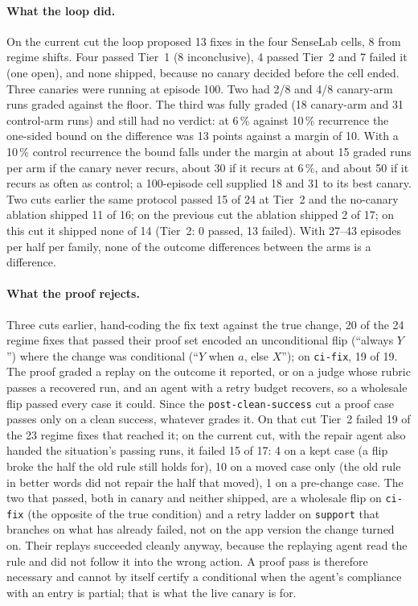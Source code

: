 \documentclass[11pt]{article}
\newcommand{\code}[1]{\texttt{#1}}
\begin{document}
\paragraph{What the loop did.} On the current cut the loop proposed 13 fixes in the four SenseLab
cells, 8 from regime shifts. Four passed Tier~1 (8 inconclusive), 4 passed Tier~2 and 7 failed
it (one open), and none shipped, because no canary decided before the cell ended. Three canaries
were running at episode 100. Two had 2/8 and 4/8 canary-arm runs graded against the floor. The
third was fully graded (18 canary-arm and 31 control-arm runs) and still had no verdict: at
6\,\% against 10\,\% recurrence the one-sided bound on the difference was 13 points against a
margin of 10. With a 10\,\% control recurrence the bound falls under the margin at about 15
graded runs per arm if the canary never recurs, about 30 if it recurs at 6\,\%, and about 50 if
it recurs as often as control; a 100-episode cell supplied 18 and 31 to its best canary. Two cuts
earlier the same protocol passed 15 of 24 at Tier~2 and the no-canary ablation shipped 11 of 16;
on the previous cut the ablation shipped 2 of 17; on this cut it shipped none of 14 (Tier~2: 0
passed, 13 failed). With 27--43 episodes per half per family, none of the outcome differences
between the arms is a difference.

\paragraph{What the proof rejects.} Three cuts earlier, hand-coding the fix text against the
true change, 20 of the 24 regime fixes that passed their proof set encoded an unconditional flip
(``always $Y$'') where the change was conditional (``$Y$ when $a$, else $X$''); on \code{ci-fix},
19 of 19. The proof graded a replay on the outcome it reported, or on a judge whose rubric passes
a recovered run, and an agent with a retry budget recovers, so a wholesale flip passed every case
it could. Since the \code{post-clean-success} cut a proof case passes only on a clean success,
whatever grades it. On that cut Tier~2 failed 19 of the 23 regime fixes that reached it; on the
current cut, with the repair agent also handed the situation's passing runs, it failed 15 of 17:
4 on a kept case (a flip broke the half the old rule still holds for), 10 on a moved case only
(the old rule in better words did not repair the half that moved), 1 on a pre-change case. The
two that passed, both in canary and neither shipped, are a wholesale flip on \code{ci-fix} (the
opposite of the true condition) and a retry ladder on \code{support} that branches on what has
already failed, not on the app version the change turned on. Their replays succeeded cleanly
anyway, because the replaying agent read the rule and did not follow it into the wrong action. A
proof pass is therefore necessary and cannot by itself certify a conditional when the agent's
compliance with an entry is partial; that is what the live canary is for.
\end{document}
